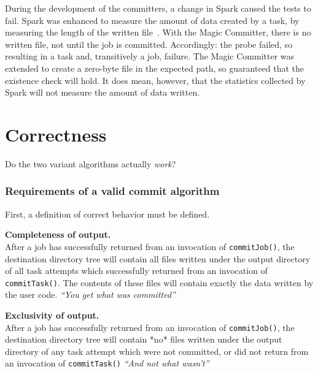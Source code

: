 \documentclass[conference]{IEEEtran}
\begin{document}
During the development of the committers, a change in Spark caused the
tests to fail.
Spark was enhanced to measure the amount of data created by a task, by
measuring the length of the written file\ \cite{SPARK-21669}.
With the Magic Committer, there is no written file, not until the job is committed.
Accordingly: the probe failed, so resulting in a task and, transitively a job, failure.
The Magic Committer was extended to create a zero-byte file in the expected path,
so guaranteed that the existence check will hold.
It does mean, however, that the statistics collected by Spark will not measure
the amount of data written.



\section{Correctness}\label{sec:correctness}

Do the two variant algorithms actually \emph{work}?


\subsubsection{Requirements of a valid commit algorithm}

First, a definition of correct behavior must be defined.

\begin{paragraph}
  \textbf{Completeness of output.}\\
  After a job has successfully returned from an invocation of \texttt{commitJob()},
  the destination directory tree will contain all files written under the output directory
  of all task attempts which successfully returned from an invocation of \texttt{commitTask()}.
  The contents of these files will contain exactly the data written by the user code.
  \emph{``You get what was committed''}
\end{paragraph}

\begin{paragraph}
  \textbf{Exclusivity of output.}\\
  After a job has successfully returned from an invocation of \texttt{commitJob()},
  the destination directory tree will contain *no* files written under the output directory
  of any task attempt which were not committed, or did not return from an invocation of \texttt{commitTask()}
  \emph{``And not what wasn't''}
\end{paragraph}
\end{document}
